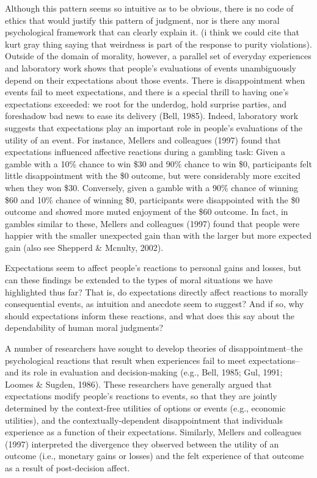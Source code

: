 \documentclass[12pt,]{article}
\begin{document}
Although this pattern seems so intuitive as to be obvious, there is no
code of ethics that would justify this pattern of judgment, nor is there
any moral psychological framework that can clearly explain it. (i think
we could cite that kurt gray thing saying that weirdness is part of the
response to purity violations). Outside of the domain of morality,
however, a parallel set of everyday experiences and laboratory work
shows that people's evaluations of events unambiguously depend on their
expectations about those events. There is disappointment when events
fail to meet expectations, and there is a special thrill to having one's
expectations exceeded: we root for the underdog, hold surprise parties,
and foreshadow bad news to ease its delivery (Bell, 1985). Indeed,
laboratory work suggests that expectations play an important role in
people's evaluations of the utility of an event. For instance, Mellers
and colleagues (1997) found that expectations influenced affective
reactions during a gambling task: Given a gamble with a 10\% chance to
win \$30 and 90\% chance to win \$0, participants felt little
disappointment with the \$0 outcome, but were considerably more excited
when they won \$30. Conversely, given a gamble with a 90\% chance of
winning \$60 and 10\% chance of winning \$0, participants were
disappointed with the \$0 outcome and showed more muted enjoyment of the
\$60 outcome. In fact, in gambles similar to these, Mellers and
colleagues (1997) found that people were happier with the smaller
unexpected gain than with the larger but more expected gain (also see
Shepperd \& Mcnulty, 2002).

Expectations seem to affect people's reactions to personal gains and
losses, but can these findings be extended to the types of moral
situations we have highlighted thus far? That is, do expectations
directly affect reactions to morally consequential events, as intuition
and anecdote seem to suggest? And if so, why should expectations inform
these reactions, and what does this say about the dependability of human
moral judgments?

A number of researchers have sought to develop theories of
disappointment--the psychological reactions that result when experiences
fail to meet expectations--and its role in evaluation and
decision-making (e.g., Bell, 1985; Gul, 1991; Loomes \& Sugden, 1986).
These researchers have generally argued that expectations modify
people's reactions to events, so that they are jointly determined by the
context-free utilities of options or events (e.g., economic utilities),
and the contextually-dependent disappointment that individuals
experience as a function of their expectations. Similarly, Mellers and
colleagues (1997) interpreted the divergence they observed between the
utility of an outcome (i.e., monetary gains or losses) and the felt
experience of that outcome as a result of post-decision affect.
\end{document}
